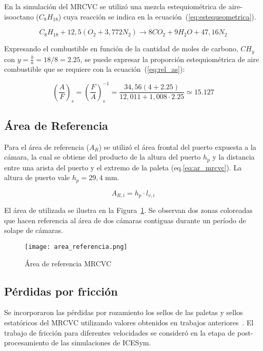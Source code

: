 En la simulación del MRCVC se utilizó una mezcla estequiométrica de
aire-isooctano ($C_{8}H_{18}$) cuya reacción se indica en la
ecuación~(\ref{eq:estequeometrica}).

\begin{equation} \label{eq:estequeometrica}
  C_{8}H_{18} + 12,5 \left(O_{2}+3,772N_{2}\right) \rightarrow 8 CO_{2} + 9 H_{2}O + 47,16 N_{2}
\end{equation}

Expresando el combustible en función de la cantidad de moles de carbono,
$CH_{y}$ con $y=\frac{b}{a}=18/8=2.25$, se puede expresar la proporción
estequiométrica de aire combustible que se requiere con la
ecuación~(\ref{eq:rel_as}):

\begin{equation} \label{eq:rel_as}
  \left(\frac{A}{F}\right)_{s} = \left(\frac{F}{A}\right)_{s}^{-1} = \frac{34,56(4+2.25)}{12,011 + 1,008\cdot 2.25} \simeq 15.127
\end{equation}

\subsection{Área de Referencia}
%
Para el área de referencia ($A_{R}$) se utilizó el área frontal del puerto
expuesta a la cámara, la cual se obtiene del producto de la altura del puerto
$h_{p}$ y la distancia entre una arista del puerto y el extremo de la paleta
(eq.\ref{eq:ar_mrcvc}).
%
La altura de puerto vale $h_{p}=29,4$ mm.

\begin{equation}\label{eq:ar_mrcvc} 
    A_{R,i} = h_{p} \cdot l_{v,i}
\end{equation}

El área de utilizada se ilustra en la Figura~\ref{fig:area_referencia}.
%
Se observan dos zonas coloreadas que hacen referencia al área de dos cámaras
contiguas durante un período de solape de cámaras.


\begin{figure}[h]
  \centering
  \texttt{[image: area\_referencia.png]}
  \caption{Área de referencia MRCVC}\label{fig:area_referencia}
\end{figure}

\subsection{Pérdidas por fricción}

Se incorporaron las pérdidas por rozamiento los sellos de las paletas y sellos
estatóricos del MRCVC utilizando valores obtenidos en trabajos
anteriores~\parencite{roldan20}.
%
El trabajo de fricción para diferentes velocidades se consideró en la etapa de
post-procesamiento de las simulaciones de ICESym.

